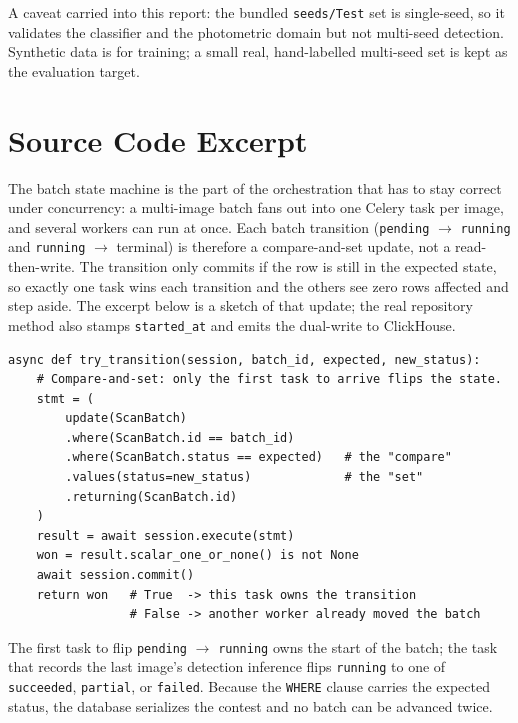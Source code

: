 \begin{singlespace}
\begin{longtable}{@{}l l p{6.6cm}@{}}
\end{longtable}
\end{singlespace}

A caveat carried into this report: the bundled \texttt{seeds/Test} set is
single-seed, so it validates the classifier and the photometric domain but not
multi-seed detection. Synthetic data is for training; a small real, hand-labelled
multi-seed set is kept as the evaluation target.


\chapter{Source Code Excerpt}
\label{appx:code}

The batch state machine is the part of the orchestration that has to stay correct
under concurrency: a multi-image batch fans out into one Celery task per image,
and several workers can run at once. Each batch transition
(\texttt{pending} $\rightarrow$ \texttt{running} and
\texttt{running} $\rightarrow$ terminal) is therefore a compare-and-set update,
not a read-then-write. The transition only commits if the row is still in the
expected state, so exactly one task wins each transition and the others see zero
rows affected and step aside. The excerpt below is a sketch of that update; the
real repository method also stamps \texttt{started\_at} and emits the dual-write
to ClickHouse.

\begin{verbatim}
async def try_transition(session, batch_id, expected, new_status):
    # Compare-and-set: only the first task to arrive flips the state.
    stmt = (
        update(ScanBatch)
        .where(ScanBatch.id == batch_id)
        .where(ScanBatch.status == expected)   # the "compare"
        .values(status=new_status)             # the "set"
        .returning(ScanBatch.id)
    )
    result = await session.execute(stmt)
    won = result.scalar_one_or_none() is not None
    await session.commit()
    return won   # True  -> this task owns the transition
                 # False -> another worker already moved the batch
\end{verbatim}

The first task to flip \texttt{pending} $\rightarrow$ \texttt{running} owns the
start of the batch; the task that records the last image's detection inference
flips \texttt{running} to one of \texttt{succeeded}, \texttt{partial}, or
\texttt{failed}. Because the \texttt{WHERE} clause carries the expected status,
the database serializes the contest and no batch can be advanced twice.
